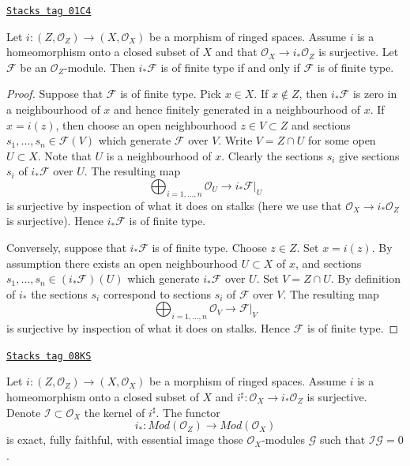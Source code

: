 \begin{lemma}
\label{modules-lemma-i-star-reflects-finite-type}
\href{https://stacks.math.columbia.edu/tag/01C4}{\texttt{Stacks tag 01C4}}

Let $i : (Z, \mathcal{O}_Z) \to (X, \mathcal{O}_X)$ be a morphism of ringed
spaces. Assume $i$ is a homeomorphism onto a closed subset of $X$ and
that $\mathcal{O}_X \to i_*\mathcal{O}_Z$ is surjective.
Let $\mathcal{F}$ be an $\mathcal{O}_Z$-module.
Then $i_*\mathcal{F}$ is of finite type if and only if
$\mathcal{F}$ is of finite type.
\end{lemma}

\begin{proof}
Suppose that $\mathcal{F}$ is of finite type.
Pick $x \in X$. If $x \not \in Z$, then $i_*\mathcal{F}$
is zero in a neighbourhood of $x$ and hence finitely generated in
a neighbourhood of $x$. If $x = i(z)$, then choose an open neighbourhood
$z \in V \subset Z$ and sections $s_1, \ldots, s_n \in \mathcal{F}(V)$
which generate $\mathcal{F}$ over $V$. Write $V = Z \cap U$ for some open
$U \subset X$. Note that $U$ is a neighbourhood of $x$. Clearly the
sections $s_i$ give sections $s_i$ of $i_*\mathcal{F}$ over $U$.
The resulting map
$$
\bigoplus\nolimits_{i = 1, \ldots, n} \mathcal{O}_U
\longrightarrow
i_*\mathcal{F}|_U
$$
is surjective by inspection of what it does on stalks
(here we use that $\mathcal{O}_X \to i_*\mathcal{O}_Z$
is surjective). Hence $i_*\mathcal{F}$
is of finite type.

\medskip\noindent
Conversely, suppose that $i_*\mathcal{F}$ is of finite type.
Choose $z \in Z$. Set $x = i(z)$. By assumption there exists
an open neighbourhood $U \subset X$ of $x$, and sections
$s_1, \ldots, s_n \in (i_*\mathcal{F})(U)$ which generate $i_*\mathcal{F}$
over $U$. Set $V = Z \cap U$. By definition of $i_*$ the sections
$s_i$ correspond to sections $s_i$ of $\mathcal{F}$ over $V$.
The resulting map
$$
\bigoplus\nolimits_{i = 1, \ldots, n} \mathcal{O}_V
\longrightarrow
\mathcal{F}|_V
$$
is surjective by inspection of what it does on stalks. Hence
$\mathcal{F}$ is of finite type.
\end{proof}

\begin{lemma}
\label{modules-lemma-i-star-equivalence}
\href{https://stacks.math.columbia.edu/tag/08KS}{\texttt{Stacks tag 08KS}}

Let $i : (Z, \mathcal{O}_Z) \to (X, \mathcal{O}_X)$ be a morphism
of ringed spaces. Assume $i$ is a homeomorphism onto a closed subset of $X$
and $i^\sharp : \mathcal{O}_X \to i_*\mathcal{O}_Z$ is surjective.
Denote $\mathcal{I} \subset \mathcal{O}_X$ the kernel of $i^\sharp$.
The functor
$$
i_* :
\textit{Mod}(\mathcal{O}_Z)
\longrightarrow
\textit{Mod}(\mathcal{O}_X)
$$
is exact, fully faithful, with essential image those
$\mathcal{O}_X$-modules $\mathcal{G}$ such that $\mathcal{I}\mathcal{G} = 0$.
\end{lemma}

